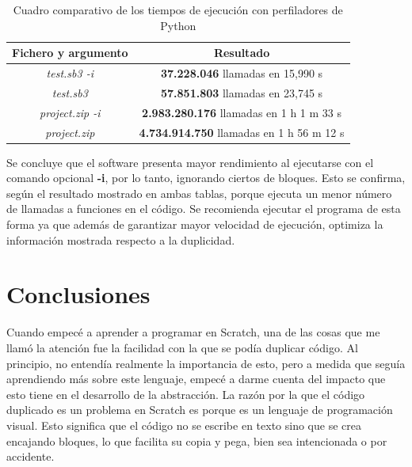 \documentclass[a4paper, 12pt]{book}
\begin{document}
\begin{table}[!htb]
 \begin{center}
  \begin{tabular}{ | c | c |} %
	\hline
     Fichero y argumento & Resultado  \\ \hline %
	\textit{test.sb3 -i}  & \textbf{37.228.046} llamadas en 15,990 s \\ \hline
    \textit{test.sb3}  & \textbf{57.851.803} llamadas en 23,745 s \\ \hline
    \textit{project.zip -i} & \textbf{2.983.280.176} llamadas en 1 h 1 m 33 s \\ \hline
    \textit{project.zip} & \textbf{4.734.914.750} llamadas en 1 h 56 m 12 s  \\ \hline
  \end{tabular}
  \caption{Cuadro comparativo de los tiempos de ejecución con perfiladores de Python\label{table:profile}}
 \end{center}
\end{table}

Se concluye que el software presenta mayor rendimiento al ejecutarse con el comando opcional \textbf{-i}, por lo tanto, ignorando ciertos de bloques. Esto se confirma, según el resultado mostrado en ambas tablas, porque ejecuta un menor número de llamadas a funciones en el código. Se recomienda ejecutar el programa de esta forma ya que además de garantizar mayor velocidad de ejecución, optimiza la información mostrada respecto a la duplicidad.



\cleardoublepage
\chapter{Conclusiones}
\label{chap:conclusiones}

Cuando empecé a aprender a programar en Scratch, una de las cosas que me llamó la atención fue la facilidad con la que se podía duplicar código. Al principio, no entendía realmente la importancia de esto, pero a medida que seguía aprendiendo más sobre este lenguaje, empecé a darme cuenta del impacto que esto tiene en el desarrollo de la abstracción. La razón por la que el código duplicado es un problema en Scratch es porque es un lenguaje de programación visual. Esto significa que el código no se escribe en texto sino que se crea encajando bloques, lo que facilita su copia y pega, bien sea intencionada o por accidente.
\end{document}
